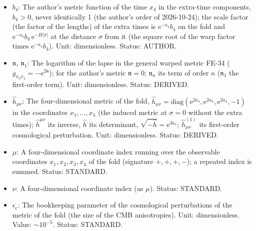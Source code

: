 \documentclass[
  10pt,
]{article}
\begin{document}
\begin{itemize}
  author's metric
  \(\mathfrak{b} = \ln b_4 - a_4 - H\lvert\sigma\rvert\);
  \(\mathfrak{b}_n\) its term of order \(n\) (\(\mathfrak{b}_1\) the
  first-order term). Unit: dimensionless. Status: DERIVED.
\item
  \(b_4\): The author's metric function of the time \(x_4\) in the
  extra-time components, \(b_4 > 0\), never identically 1 (the author's
  order of 2026-10-24); the scale factor (the factor of the lengths) of
  the extra times is \(\mathrm{e}^{-a_4}b_4\) on the fold and
  \(\mathrm{e}^{-a_4}b_4\,\mathrm{e}^{-H\lvert\sigma\rvert}\) at the
  distance \(\sigma\) from it (the square root of the warp factor times
  \(\mathrm{e}^{-a_4}b_4\)). Unit: dimensionless. Status: AUTHOR.
\item
  \(\mathfrak{n},\ \mathfrak{n}_1\): The logarithm of the lapse in the
  general warped metric FE-34
  (\(g_{x_4x_4} = -\mathrm{e}^{2\mathfrak{n}}\)); for the author's
  metric \(\mathfrak{n} = 0\); \(\mathfrak{n}_n\) its term of order
  \(n\) (\(\mathfrak{n}_1\) the first-order term). Unit: dimensionless.
  Status: DERIVED.
\item
  \(\hat h_{\mu\nu}\): The four-dimensional metric of the fold,
  \(\hat h_{\mu\nu} = \mathrm{diag}(\mathrm{e}^{2a_4}, \mathrm{e}^{2a_4}, \mathrm{e}^{2a_4}, -1)\)
  in the coordinates \(x_1, \dots, x_4\) (the induced metric at
  \(\sigma = 0\) without the extra times); \(\hat h^{\mu\nu}\) its
  inverse, \(\hat h\) its determinant,
  \(\sqrt{-\hat h} = \mathrm{e}^{3a_4}\); \(\hat h^{(1)}_{\mu\nu}\) its
  first-order cosmological perturbation. Unit: dimensionless. Status:
  DERIVED.
\item
  \(\mu\): A four-dimensional coordinate index running over the
  observable coordinates \(x_1, x_2, x_3, x_4\) of the fold (signature
  \(+,+,+,-\)); a repeated index is summed. Status: STANDARD.
\item
  \(\nu\): A four-dimensional coordinate index (as \(\mu\)). Status:
  STANDARD.
\item
  \(\epsilon_{\mathrm{c}}\): The bookkeeping parameter of the
  cosmological perturbations of the metric of the fold (the size of the
  CMB anisotropies). Unit: dimensionless. Value: \(\sim 10^{-5}\).
  Status: STANDARD.
\end{itemize}
\end{document}
